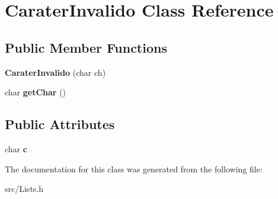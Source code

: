 \hypertarget{class_carater_invalido}{}\section{Carater\+Invalido Class Reference}
\label{class_carater_invalido}
\subsection*{Public Member Functions}
\begin{DoxyCompactItemize}
\item 
\hypertarget{class_carater_invalido_ace18d5abf0d09ef2b85596d870ca0154}{}{\bfseries Carater\+Invalido} (char ch)\label{class_carater_invalido_ace18d5abf0d09ef2b85596d870ca0154}

\item 
\hypertarget{class_carater_invalido_a8402acadc76c08b16b6454fdfa01e6ac}{}char {\bfseries get\+Char} ()\label{class_carater_invalido_a8402acadc76c08b16b6454fdfa01e6ac}

\end{DoxyCompactItemize}
\subsection*{Public Attributes}
\begin{DoxyCompactItemize}
\item 
\hypertarget{class_carater_invalido_ae81962dfb2a001f8b73c2c48aec84b57}{}char {\bfseries c}\label{class_carater_invalido_ae81962dfb2a001f8b73c2c48aec84b57}

\end{DoxyCompactItemize}


The documentation for this class was generated from the following file\+:\begin{DoxyCompactItemize}
\item 
src/Lists.\+h\end{DoxyCompactItemize}
